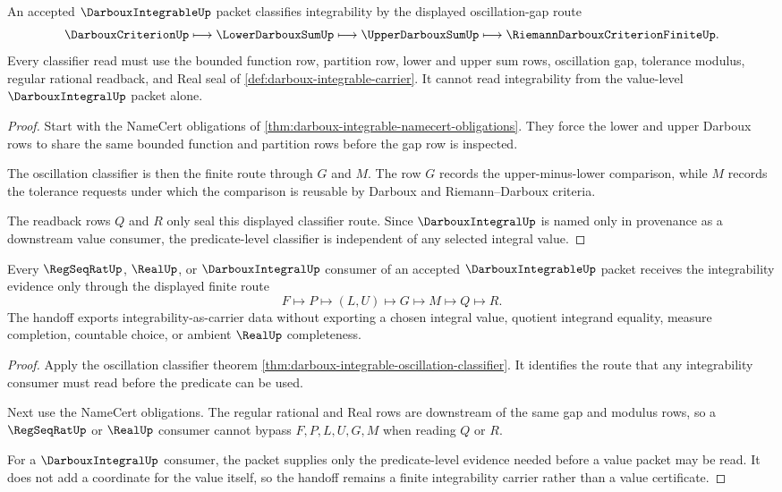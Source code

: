 \begin{theorem}\label{thm:darboux-integrable-oscillation-classifier}
An accepted $\DarbouxIntegrableUp$ packet classifies integrability by the displayed oscillation-gap route
$$
\DarbouxCriterionUp \longmapsto \LowerDarbouxSumUp \longmapsto \UpperDarbouxSumUp \longmapsto \RiemannDarbouxCriterionFiniteUp .
$$
Every classifier read must use the bounded function row, partition row, lower and upper sum rows, oscillation gap, tolerance modulus, regular rational readback, and Real seal of \autoref{def:darboux-integrable-carrier}. It cannot read integrability from the value-level $\DarbouxIntegralUp$ packet alone.
\end{theorem}
\begin{proof}
Start with the NameCert obligations of \autoref{thm:darboux-integrable-namecert-obligations}. They force the lower and upper Darboux rows to share the same bounded function and partition rows before the gap row is inspected.

The oscillation classifier is then the finite route through $G$ and $M$. The row $G$ records the upper-minus-lower comparison, while $M$ records the tolerance requests under which the comparison is reusable by Darboux and Riemann--Darboux criteria.

The readback rows $Q$ and $R$ only seal this displayed classifier route. Since $\DarbouxIntegralUp$ is named only in provenance as a downstream value consumer, the predicate-level classifier is independent of any selected integral value.
\end{proof}

\begin{theorem}\label{thm:darboux-integrable-real-handoff}
Every $\RegSeqRatUp$, $\RealUp$, or $\DarbouxIntegralUp$ consumer of an accepted $\DarbouxIntegrableUp$ packet receives the integrability evidence only through the displayed finite route
$$
F\longmapsto P\longmapsto (L,U)\longmapsto G\longmapsto M\longmapsto Q\longmapsto R .
$$
The handoff exports integrability-as-carrier data without exporting a chosen integral value, quotient integrand equality, measure completion, countable choice, or ambient $\RealUp$ completeness.
\end{theorem}
\begin{proof}
Apply the oscillation classifier theorem \autoref{thm:darboux-integrable-oscillation-classifier}. It identifies the route that any integrability consumer must read before the predicate can be used.

Next use the NameCert obligations. The regular rational and Real rows are downstream of the same gap and modulus rows, so a $\RegSeqRatUp$ or $\RealUp$ consumer cannot bypass $F,P,L,U,G,M$ when reading $Q$ or $R$.

For a $\DarbouxIntegralUp$ consumer, the packet supplies only the predicate-level evidence needed before a value packet may be read. It does not add a coordinate for the value itself, so the handoff remains a finite integrability carrier rather than a value certificate.
\end{proof}

